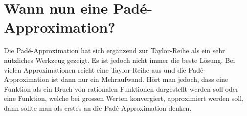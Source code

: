 %
%
%
\section{Wann nun eine Padé-Approximation? 
\label{pade:section:folgerungen}}
Die Padé-Approximation hat sich ergänzend zur Taylor-Reihe als ein sehr nützliches Werkzeug gezeigt.
Es ist jedoch nicht immer die beste Lösung.
Bei vielen Approximationen reicht eine Taylor-Reihe aus und die Padé-Approximation ist dann nur ein Mehraufwand.
Hört man jedoch, dass eine Funktion als ein Bruch von rationalen Funktionen dargestellt werden soll oder  
eine Funktion, welche bei grossen Werten konvergiert, approximiert werden soll, dann sollte man als erstes an die Padé-Approximation denken.




